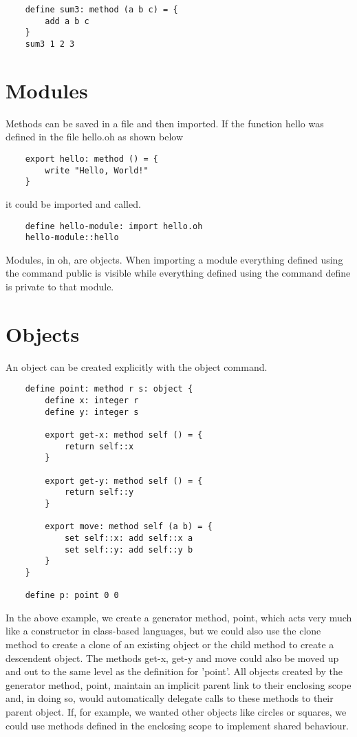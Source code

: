 \documentclass[12pt]{book}
\begin{document}
\begin{lstlisting}
	define sum3: method (a b c) = {
		add a b c
	}
	sum3 1 2 3
\end{lstlisting}


\section{Modules}

Methods can be saved in a file and then imported. If the function hello
was defined in the file hello.oh as shown below

\begin{lstlisting}
	export hello: method () = {
		write "Hello, World!"
	}
\end{lstlisting}

it could be imported and called.

\begin{lstlisting}
	define hello-module: import hello.oh
	hello-module::hello
\end{lstlisting}

Modules, in oh, are objects. When importing a module everything defined
using the command public is visible while everything defined using the
command define is private to that module.


\section{Objects}
An object can be created explicitly with the object command.

\begin{lstlisting}
	define point: method r s: object {
		define x: integer r
		define y: integer s

		export get-x: method self () = {
			return self::x
		}

		export get-y: method self () = {
			return self::y
		}

		export move: method self (a b) = {
			set self::x: add self::x a
			set self::y: add self::y b
		}
	}

	define p: point 0 0
\end{lstlisting}

In the above example, we create a generator method, point, which acts
very much like a constructor in class-based languages, but we could also
use the clone method to create a clone of an existing object or the
child method to create a descendent object.  The methods get-x, get-y
and move could also be moved up and out to the same level as the
definition for 'point'. All objects created by the generator method,
point, maintain an implicit parent link to their enclosing scope and,
in doing so, would automatically delegate calls to these methods to their
parent object. If, for example, we wanted other objects like circles
or squares, we could use methods defined in the enclosing scope to
implement shared behaviour.
\end{document}

